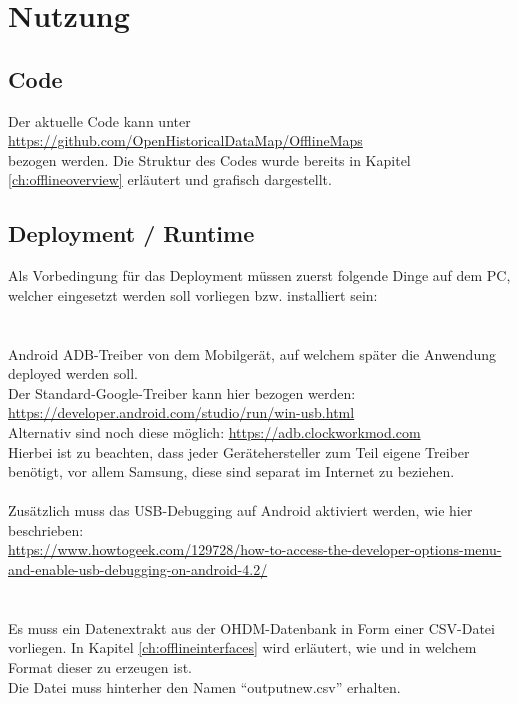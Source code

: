 \section{Nutzung}
\subsection{Code}
Der aktuelle Code kann unter\\ \url{https://github.com/OpenHistoricalDataMap/OfflineMaps}\\ bezogen werden. Die Struktur des Codes wurde bereits in Kapitel \ref{ch:offlineoverview} erläutert und grafisch dargestellt.

\subsection{Deployment / Runtime}
Als Vorbedingung für das Deployment müssen zuerst folgende Dinge auf dem PC, welcher eingesetzt werden soll vorliegen bzw. installiert sein:\\
\\\\
Android ADB-Treiber von dem Mobilgerät, auf welchem später die Anwendung deployed werden soll.\\
Der Standard-Google-Treiber kann hier bezogen werden:\\ \url{https://developer.android.com/studio/run/win-usb.html}\\
Alternativ sind noch diese möglich: \url{https://adb.clockworkmod.com}\\
Hierbei ist zu beachten, dass jeder Gerätehersteller zum Teil eigene Treiber benötigt, vor allem Samsung, diese sind separat im Internet zu beziehen.\\\\
Zusätzlich muss das USB-Debugging auf Android aktiviert werden, wie hier beschrieben:\\
\url{https://www.howtogeek.com/129728/how-to-access-the-developer-options-menu-and-enable-usb-debugging-on-android-4.2/}\\\\\\
Es muss ein Datenextrakt aus der OHDM-Datenbank in Form einer CSV-Datei vorliegen. In Kapitel \ref{ch:offlineinterfaces} wird erläutert, wie und in welchem Format dieser zu erzeugen ist.\\ Die Datei muss hinterher den Namen ``outputnew.csv'' erhalten.\\\\\\
